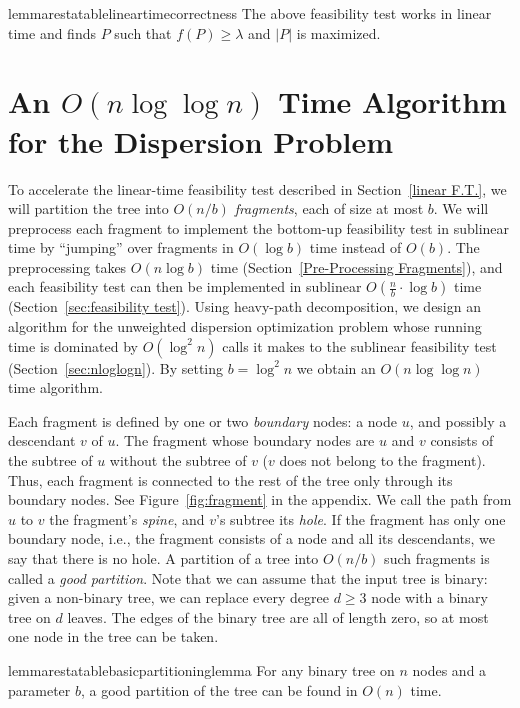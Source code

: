 \documentclass[a4paper,UKenglish]{lipics-v2016}
\theoremstyle{plain}
\begin{document}
\begin{restatable}{lemmarestatable}{lineartimecorrectness}
\label{lineartimecorrectness}
The above feasibility test works in linear time and finds $P$ such that $f(P)\geq\lambda$ and $|P|$ is maximized.
\end{restatable}

\section{An \texorpdfstring{\boldmath$O(n\log\log n)$}{O(nloglogn)} Time Algorithm for the Dispersion Problem}
\label{sublinear f.t.}

To accelerate the linear-time feasibility test described in Section~\ref{linear F.T.}, we will partition the tree into $O(n/b)$ {\em fragments}, each of size at most
$b$. We will preprocess each fragment to implement the bottom-up feasibility test in sublinear time by  ``jumping'' over fragments in $O(\log b)$ time instead of $O(b)$.  The preprocessing takes $O(n\log b)$ time (Section~\ref{Pre-Processing Fragments}), and each feasibility test can then be implemented in sublinear $O(\frac{n}{b} \cdot \log b)$ time (Section~\ref{sec:feasibility test}). Using heavy-path decomposition, we design an algorithm for the unweighted dispersion optimization problem whose running time is dominated by $O(\log^{2}n)$ calls it makes to the sublinear feasibility test  (Section~\ref{sec:nloglogn}). By setting $b=\log^{2}n$ we obtain an $O(n\log\log n)$ time algorithm.


Each fragment is defined by one or two {\em boundary} nodes: a node $u$, and possibly a descendant $v$ of $u$. The fragment whose boundary nodes are $u$ and $v$ consists of the subtree of $u$ without the subtree of $v$ ($v$ does not belong to the fragment). Thus, each fragment is connected to the rest of the tree only through its boundary nodes. See Figure~\ref{fig:fragment} in the appendix. 
We call the path from $u$ to $v$ the fragment's \textit{spine}, and $v$'s subtree its \textit{hole}. If the
fragment has only one boundary node, i.e., the fragment consists of a node and all its descendants, we say that there is no hole.
A partition of a tree into $O(n/b)$ such fragments is called a \emph{good partition}.
Note that we can assume that the input tree is binary: given a non-binary tree, we can replace every degree $d\geq 3$ node with a binary tree on
$d$ leaves. The edges of the binary tree are all of length zero, so at most one node in the tree can be taken.

\begin{restatable}{lemmarestatable}{basicpartitioninglemma}
\label{basic partitioning lemma}
For any binary tree on $n$ nodes and a parameter $b$, a good partition of the tree can be found in $O(n)$ time.
\end{restatable}
\end{document}
